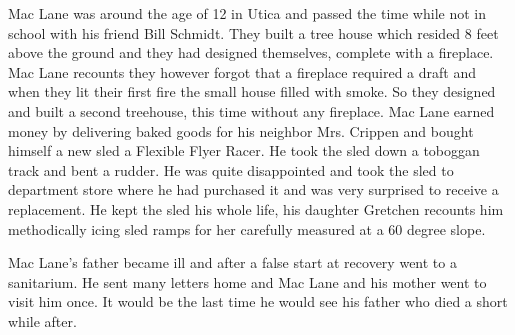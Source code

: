 Mac Lane was around the age of 12 in Utica and passed the time while not in school with his friend Bill Schmidt. They built a tree house which resided 8 feet above the ground and they had designed themselves, complete with a fireplace. Mac Lane recounts they however forgot that a fireplace required a draft and when they lit their first fire the small house filled with smoke. So they designed and built a second treehouse, this time without any fireplace. Mac Lane earned money by delivering baked goods for his neighbor Mrs. Crippen and bought himself a new sled a Flexible Flyer Racer. He took the sled down a toboggan track and bent a rudder. He was quite disappointed and took the sled to department store where he had purchased it and was very surprised to receive a replacement. He kept the sled his whole life, his daughter Gretchen recounts him methodically icing sled ramps for her carefully measured at a 60 degree slope. 

Mac Lane's father became ill and after a false start at recovery went to a sanitarium. He sent many letters home and Mac Lane and his mother went to visit him once. It would be the last time he would see his father who died a short while after. 